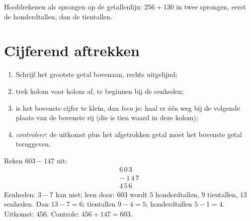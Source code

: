 \begin{omfigure}

{\small Hoofdrekenen als sprongen op de getallenlijn: $256 + 130$ in
twee sprongen, eerst de honderdtallen, dan de tientallen.}
\end{omfigure}

\section{Cijferend aftrekken}

\begin{method}\label{met:g3:addsub:sub}
\begin{enumerate}
  \item Schrijf het grootste getal bovenaan, rechts uitgelijnd;
  \item trek kolom voor kolom af, te beginnen bij de eenheden;
  \item is het bovenste cijfer te klein, dan \emph{leen} je: haal er
        één weg bij de volgende plaats van de bovenste rij (die is tien
        waard in deze kolom);
  \item \emph{controleer}: de uitkomst plus het afgetrokken getal moet
        het bovenste getal teruggeven.
\end{enumerate}
\end{method}

\begin{example}\label{ex:g3:addsub:sub}
Reken $603 - 147$ uit:
\[
\begin{array}{r}
6\,0\,3 \\
-\ 1\,4\,7 \\
\hline
4\,5\,6
\end{array}
\]
Eenheden: $3 - 7$ kan niet; leen door: $603$ wordt $5$ honderdtallen,
$9$ tientallen, $13$ eenheden. Dan $13 - 7 = 6$; tientallen
$9 - 4 = 5$; honderdtallen $5 - 1 = 4$. Uitkomst: $456$. Controle:
$456 + 147 = 603$.
\end{example}

